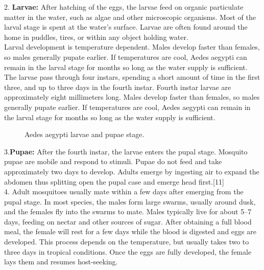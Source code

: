 \documentclass[11pt]{exam}
\begin{document}
\begin{questions}
2. \textbf{Larvae:} After hatching of the eggs, the larvae feed on organic particulate matter in the water, such as algae and other microscopic organisms. Most of the larval stage is spent at the water's surface. Larvae are often found around the home in puddles, tires, or within any object holding water.\\ %
Larval development is temperature dependent. Males develop faster than females, so males generally pupate earlier. If temperatures are cool, Aedes aegypti can remain in the larval stage for months so long as the water supply is sufficient. \\
The larvae pass through four instars, spending a short amount of time in the first three, and up to three days in the fourth instar. Fourth instar larvae are approximately eight millimeters long. 
Males develop faster than females, so males generally pupate earlier. If temperatures are cool, Aedes aegypti can remain in the larval stage for months so long as the water supply is sufficient.\\ 
\begin{figure}[H]
  \centering
    \hfill
  \caption{Aedes aegypti larvae and pupae stage.}
  \label{Ae.Aegypti life stages.}    
\end{figure} 

3.\textbf{Pupae:} After the fourth instar, the larvae enters the pupal stage. Mosquito pupae are mobile and respond to stimuli. Pupae do not feed and take approximately two days to develop. Adults emerge by ingesting air to expand the abdomen thus splitting open the pupal case and emerge head first.[11]\\

4. Adult mosquitoes usually mate within a few days after emerging from the pupal stage. In most species, the males form large swarms, usually around dusk, and the females fly into the swarms to mate. Males typically live for about 5–7 days, feeding on nectar and other sources of sugar. After obtaining a full blood meal, the female will rest for a few days while the blood is digested and eggs are developed. This process depends on the temperature, but usually takes two to three days in tropical conditions. Once the eggs are fully developed, the female lays them and resumes host-seeking. \\


\end{questions}
\end{document}
